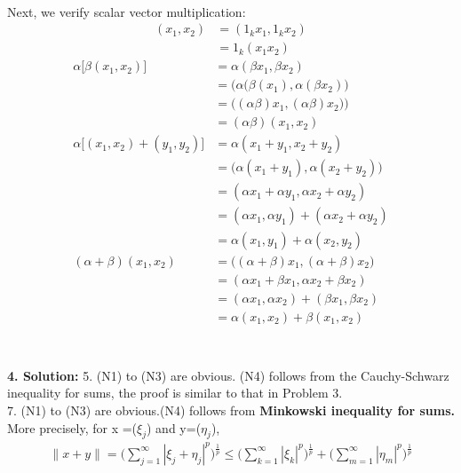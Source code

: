 \documentclass{article}
\begin{document}
\\
Next, we verify scalar vector multiplication:
\\
\begin{align*}
    ({x_1},{x_2})&=({1_k}{x_1},{1_k}{x_2})\\
    &={1_k}({x_1}{x_2})
\end{align*}
\begin{align*}
    \alpha\Big[\beta({x_1},{x_2})\Big]&=\alpha(\beta{x_1},\beta{x_2})\\
    &=\Big(\alpha(\beta({x_1}),\alpha(\beta{x_2})\Big)\\
    &=\Big((\alpha\beta){x_1},(\alpha\beta){x_2})\Big)\\
    &=(\alpha\beta)({x_1},{x_2})\\
    \alpha\Big[({x_1},{x_2})+({y_1,y_2})\Big]&=\alpha({x_1}+{y_1},{x_2}+{y_2})\\
    &=\Big(\alpha({x_1}+{y_1}),\alpha({x_2}+{y_2})\Big)\\
    &=(\alpha{x_1}+\alpha{y_1},\alpha{x_2}+\alpha{y_2})\\
    &=(\alpha{x_1},\alpha{y_1})+(\alpha{x_2}+\alpha{y_2})\\
    &=\alpha({x_1},{y_1})+\alpha({x_2},{y_2})\\
    (\alpha+\beta)({x_1,x_2})&=\Big((\alpha+\beta){x_1},(\alpha+\beta){x_2}\Big)\\
    &=(\alpha{x_1}+\beta{x_1},\alpha{x_2}+\beta{x_2})\\
    &=(\alpha{x_1},\alpha{x_2})+(\beta{x_1},\beta{x_2})\\
    &=\alpha({x_1},{x_2})+\beta({x_1},{x_2})\\
\end{align*}
\\
\\
\textbf{4. Solution: }5. (N1) to (N3) are obvious. (N4) follows from the Cauchy-Schwarz inequality for sums, the proof is similar to that in Problem 3.
\\
7. (N1) to (N3) are obvious.(N4) follows from \textbf{Minkowski inequality for sums.} More precisely, for x =({$\xi_j$}) and y=({$\eta_j$}),\\
\begin{align*}
\|x+y\|=\Bigg(\sum_{j=1}^{\infty}|\xi_j+\eta_j|^p\Bigg)^\frac{1}{p}\leq\Bigg(\sum_{k=1}^{\infty}|\xi_k|^p\Bigg)^\frac{1}{p}+\Bigg(\sum_{m=1}^{\infty}|\eta_m|^p\Bigg)^\frac{1}{p}
\end{align*}
\\
\\
\end{document}
